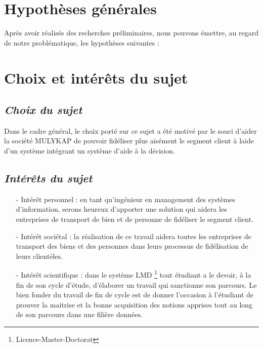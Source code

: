 \documentclass[a4paper,12pt,oneside]{book}
\begin{document}
        \section[Hypothèses générales]{Hypothèses générales}
        Après avoir réalisés des recherches préliminaires, nous pouvons émettre, au regard
        de notre problématique, les hypothèses suivantes :

        \section[Choix et interet du sujet]{Choix et intérêts du sujet}
            \subsection[Choix du sujet]{\textit{Choix du sujet}}
            Dans le cadre général, le choix porté sur ce sujet a été motivé par le souci d’aider
            la société MULYKAP de pouvoir fidéliser plus aisément le segment client à laide d’un
            système intégrant un système d’aide à la décision.
            \subsection[Interet du sujet]{\textit{Intérêts du sujet}}
                \begin{itemize}
                    \item [-] Intérêt personnel : en tant qu’ingénieur en management 
                    des systèmes d’information, serons heureux d’apporter une solution
                    qui aidera les entreprises de transport de bien et de personne de fidéliser
                    le segment client.
                    \newline

                    \item [-] Intérêt sociétal : la réalisation de ce travail aidera toutes les
                    entreprises de transport des biens et des personnes dans leurs processus de
                    fidélisation de leurs clientèles.
                    \newline

                    \item [-] Intérêt scientifique : dans le système LMD \footnote[1]{Licence-Master-Doctorat} tout étudiant
                    a le devoir, à la fin de son cycle d’étude, d’élaborer un travail qui
                    sanctionne son parcours. Le bien fonder du travail de fin de cycle
                    est de donner l’occasion à l’étudiant de prouver la maitrise et la bonne acquisition
                    des notions apprises tout au long de son parcours dans une filière données.
                \end{itemize}
\end{document}
